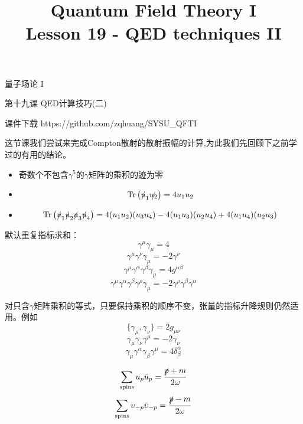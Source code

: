 \documentclass[CJK]{beamer}
\title{Quantum Field Theory I \\ Lesson 19 - QED techniques II}
\author{}
\date{}
\begin{document}
\begin{frame}
 
\begin{center}
\begin{Large}
\bch
量子场论 I 

{\vskip 0.3in}

第十九课 QED计算技巧(二)

\ech
\end{Large}
\end{center}

\vskip 0.2in

\bch
课件下载
\ech
https://github.com/zqhuang/SYSU\_QFTI

\end{frame}



\begin{frame}
\bch
{\small
这节课我们尝试来完成Compton散射的散射振幅的计算,为此我们先回顾下之前学过的有用的结论。

\begin{itemize}
\item{奇数个不包含$\gamma^5$的$\gamma$矩阵的乘积的迹为零}
\item{$$\mathrm{Tr}\left(\slashed{u}_1\slashed{u_2}\right) = 4u_1u_2$$ }
\item{
$$\mathrm{Tr}\left(\slashed{u}_1\slashed{u}_2\slashed{u}_3\slashed{u}_4\right) = 4(u_1u_2)(u_3u_4) - 4(u_1u_3)(u_2u_4)+4(u_1u_4)(u_2u_3) $$
}
\end{itemize}
}
\ech
\end{frame}


\begin{frame}
\bch
{\small
默认重复指标求和：
$$ \gamma^\mu\gamma_\mu = 4 $$
$$ \gamma^\mu \gamma^\nu \gamma_\mu = -2\gamma^\nu $$
$$ \gamma^\mu \gamma^\alpha\gamma^\beta\gamma_\mu = 4g^{\alpha\beta} $$
$$ \gamma^\mu \gamma^\alpha\gamma^\beta\gamma^\rho\gamma_\mu = -2\gamma^\rho\gamma^\beta\gamma^\alpha $$

对只含$\gamma$矩阵乘积的等式，只要保持乘积的顺序不变，张量的指标升降规则仍然适用。例如
$$\{\gamma_\mu, \gamma_\nu\} = 2 g_{\mu\nu}$$
$$ \gamma_\mu \gamma_\nu \gamma^\mu = -2\gamma_\nu $$
$$ \gamma_\mu \gamma^\alpha\gamma_\beta \gamma^\mu = 4\delta^\alpha_\beta $$

}
\ech
\end{frame}

\begin{frame}
\bch
$$\sum_{\rm spins} u_p \bar{u}_p = \frac{\slashed{p} + m}{2\omega}$$
$$\sum_{\rm spins} \upsilon_{-p} \bar{\upsilon}_{-p} = \frac{\slashed{p} - m}{2\omega}$$
\ech
\end{frame}
\end{document}
